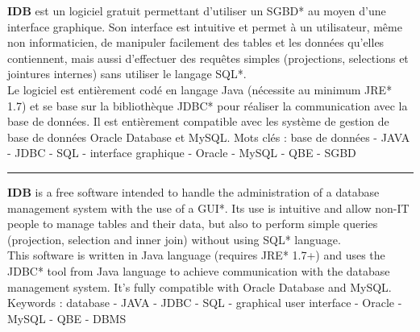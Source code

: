 \thispagestyle{empty}
\textbf{IDB} est un logiciel gratuit permettant d'utiliser un SGBD* au moyen d'une interface graphique.
Son interface est intuitive et permet à un utilisateur, même non informaticien, de manipuler facilement des tables et les données qu'elles contiennent, mais aussi d'effectuer des requêtes simples (projections, selections et jointures internes) sans utiliser le langage SQL*.
\\
Le logiciel est entièrement codé en langage Java (nécessite au minimum JRE* 1.7) et se base sur la bibliothèque \gls{JDBC}* pour réaliser la communication avec la base de données. Il est entièrement compatible avec les système de gestion de base de données Oracle Database et MySQL.
\bigbreak
Mots clés : base de données - JAVA - JDBC - SQL - interface graphique - Oracle - MySQL - QBE - SGBD

\bigbreak
\rule{\linewidth}{0.4pt}
\bigbreak

\textbf{IDB} is a free software intended to handle the administration of a database management system with the use of a GUI*.
Its use is intuitive and allow non-IT people to manage tables and their data, but also to perform simple queries (projection, selection and inner join) without using SQL* language.
\\
This software is written in Java language (requires JRE* 1.7+) and uses the \gls{JDBC}* tool from Java language to achieve communication with the database management system. It's fully compatible with Oracle Database and MySQL.
\bigbreak
Keywords : database - JAVA - JDBC - SQL - graphical user interface - Oracle - MySQL - QBE - DBMS
